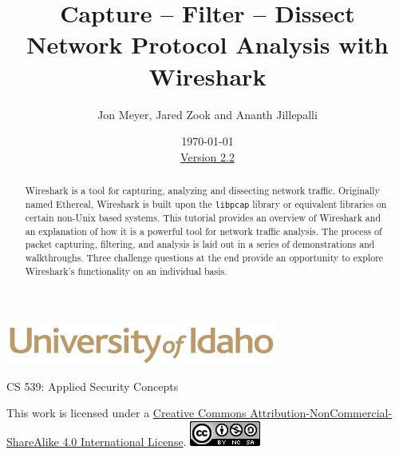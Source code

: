 \documentclass[12pt]{extarticle}
\begin{document}
\title{ Capture -- Filter -- Dissect \\ \large Network Protocol Analysis with Wireshark}
\author{Jon Meyer, Jared Zook and Ananth Jillepalli}
\date{\today \\ \hyperref[changelog]{Version 2.2}}
\renewcommand{\abstractname}{Summary}
\begin{titlepage}
\maketitle
{}
\begin{center}
\includegraphics[scale=.5]{UofI}

\large{CS 539: Applied Security Concepts}

\vskip 40pt

\end{center}
\begin{abstract}
Wireshark is a tool for capturing, analyzing and dissecting network traffic. Originally named Ethereal, Wireshark is built upon the \texttt{libpcap} library or equivalent libraries on certain non-Unix based systems. This tutorial provides an overview of Wireshark and an explanation of how it is a powerful tool for network traffic analysis. The process of packet capturing, filtering, and analysis is laid out in a series of demonstrations and walkthroughs. Three challenge questions at the end provide an opportunity to explore Wireshark's functionality on an individual basis.
\end{abstract}


\vfill
\begin{center}
This work is licensed under a \href{https://creativecommons.org/licenses/by-nc-sa/4.0/legalcode}{Creative Commons Attribution-NonCommercial-ShareAlike 4.0 International License}.
\vskip 10pt
\includegraphics[scale=.5]{cc}
\end{center}

\end{titlepage}


\pagebreak
\tableofcontents

\end{document}
